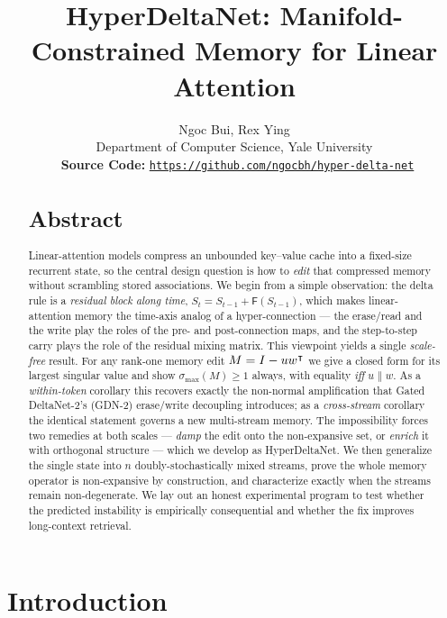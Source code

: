 \documentclass[11pt,letterpaper,logo]{yalearxiv}
\title{HyperDeltaNet: Manifold-Constrained Memory for Linear Attention}
\author{Ngoc Bui\yale, Rex Ying\yale\\
\yale Department of Computer Science, Yale University\\
\faGithub~\textbf{Source Code:} \href{https://github.com/ngocbh/hyper-delta-net}{\texttt{https://github.com/ngocbh/hyper-delta-net}}
}
\newcommand{\smax}{\sigma_{\max}}
\newcommand{\Fdelta}{\mathsf{F}}               %
\begin{document}
\begin{abstract}
\vspace{-1mm}
{\centering\section*{Abstract}}
Linear-attention models compress an unbounded key--value cache into a fixed-size
recurrent state, so the central design question is how to \emph{edit} that compressed
memory without scrambling stored associations. We begin from a simple observation: the
delta rule is a \emph{residual block along time}, $S_t = S_{t-1} + \Fdelta(S_{t-1})$,
which makes linear-attention memory the time-axis analog of a hyper-connection --- the
erase/read and the write play the roles of the pre- and post-connection maps, and the
step-to-step carry plays the role of the residual mixing matrix. This viewpoint yields a
single \emph{scale-free} result. For any rank-one memory edit $M = I - u w^{\intercal}$ we give
a closed form for its largest singular value and show $\smax(M) \ge 1$ always, with
equality \emph{iff} $u \parallel w$. As a \emph{within-token} corollary this recovers
exactly the non-normal amplification that Gated DeltaNet-2's (GDN-2) erase/write
decoupling introduces; as a \emph{cross-stream} corollary the identical statement governs
a new multi-stream memory. The impossibility forces two remedies at both scales ---
\emph{damp} the edit onto the non-expansive set, or \emph{enrich} it with orthogonal
structure --- which we develop as HyperDeltaNet. We then generalize the single state into
$n$ doubly-stochastically mixed streams, prove the whole memory operator is non-expansive
by construction, and characterize exactly when the streams remain non-degenerate. We lay
out an honest experimental program to test whether the predicted instability is
empirically consequential and whether the fix improves long-context retrieval.
\end{abstract}


\maketitle


\section{Introduction}
\label{sec:intro}
\end{document}
